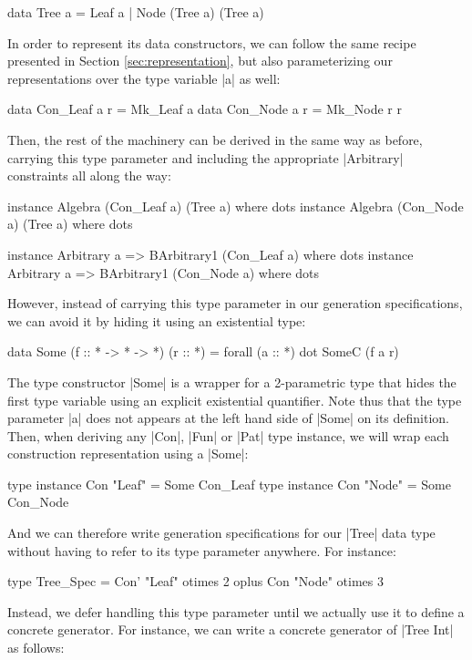 \begin{code}
data Tree a = Leaf a | Node (Tree a) (Tree a)
\end{code}

In order to represent its data constructors, we can follow the same recipe
presented in Section \ref{sec:representation}, but also parameterizing our
representations over the type variable |a| as well:

\begin{code}
data Con_Leaf a r = Mk_Leaf a
data Con_Node a r = Mk_Node r r
\end{code}

Then, the rest of the machinery can be derived in the same way as before,
carrying this type parameter and including the appropriate |Arbitrary|
constraints all along the way:

\begin{code}
instance Algebra (Con_Leaf a) (Tree a) where dots
instance Algebra (Con_Node a) (Tree a) where dots

instance Arbitrary a => BArbitrary1 (Con_Leaf a) where dots
instance Arbitrary a => BArbitrary1 (Con_Node a) where dots
\end{code}

%
However, instead of carrying this type parameter in our generation
specifications, we can avoid it by hiding it using an existential type:

\begin{code}
data Some (f :: * -> * -> *) (r :: *) = forall (a :: *) dot SomeC (f a r)
\end{code}
%
The type constructor |Some| is a wrapper for a 2-parametric type that hides the
first type variable using an explicit existential quantifier.
%
Note thus that the type parameter |a| does not appears at the left hand side of
|Some| on its definition.
%
Then, when deriving any |Con|, |Fun| or |Pat| type instance, we will wrap each
construction representation using a |Some|:

\begin{code}
type instance Con "Leaf" = Some Con_Leaf
type instance Con "Node" = Some Con_Node
\end{code}

And we can therefore write generation specifications for our |Tree| data type
without having to refer to its type parameter anywhere.
%
For instance:

\begin{code}
type Tree_Spec  =      Con'  "Leaf"  otimes 2
                oplus  Con   "Node"  otimes 3
\end{code}
%
Instead, we defer handling this type parameter until we actually use it to
define a concrete generator.
%
For instance, we can write a concrete generator of |Tree Int| as follows:

